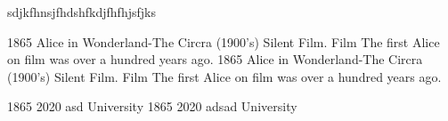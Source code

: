 \documentclass[9pt]{developercv} %
\begin{document}
\vspace{0.5cm}



\begin{minipage}[t]{0.4\textwidth} %
	\vspace{-\baselineskip} %
	
	sdjkfhnsjfhdshfkdjfhfhjsfjks
\end{minipage}
\hfill %
\begin{minipage}[t]{0.5\textwidth} %
	\vspace{-\baselineskip} %
	\begin{barchart}{5.5}
	\end{barchart}
\end{minipage}



\begin{entrylist}
	 \entry
		   {1865}
		   {Alice in Wonderland-The Circra (1900's) Silent Film.}
		   {Film}
		   {The first Alice on film was over a hundred years ago.}
	 \entry
		   {1865}
		   {Alice in Wonderland-The Circra (1900's) Silent Film.}
		   {Film}
		   {The first Alice on film was over a hundred years ago.}
\end{entrylist}



\begin{entrylist}
		 \entry
		   {1865}
		   {2020}
		   {asd}
		   {University}
	 \entry
		   {1865}
		   {2020}
		   {adsad}
		   {University}
\end{entrylist}
\end{document}
